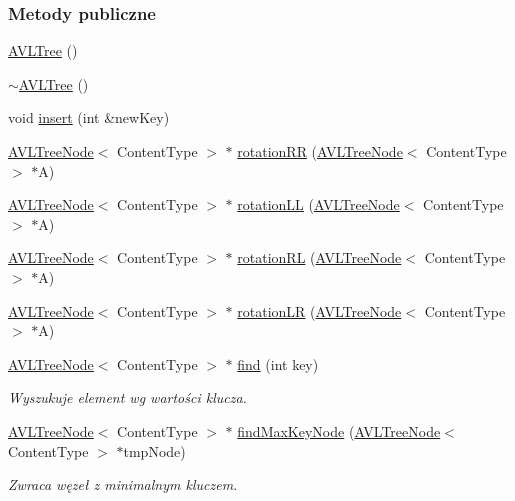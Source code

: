 \subsubsection*{Metody publiczne}
\begin{DoxyCompactItemize}
\item 
\hyperlink{class_a_v_l_tree_ab2eeaf55f5521c4d9d0090b0ea74c92c}{A\-V\-L\-Tree} ()
\item 
\hyperlink{class_a_v_l_tree_a51346b432823dce79badfd69e0a4236c}{$\sim$\-A\-V\-L\-Tree} ()
\item 
void \hyperlink{class_a_v_l_tree_a3a85ff5f0b56af6c8b358611f8de95af}{insert} (int \&new\-Key)
\item 
\hyperlink{class_a_v_l_tree_node}{A\-V\-L\-Tree\-Node}$<$ Content\-Type $>$ $\ast$ \hyperlink{class_a_v_l_tree_a81a6d1f73184e06ad92861b6ec2f96d7}{rotation\-R\-R} (\hyperlink{class_a_v_l_tree_node}{A\-V\-L\-Tree\-Node}$<$ Content\-Type $>$ $\ast$A)
\item 
\hyperlink{class_a_v_l_tree_node}{A\-V\-L\-Tree\-Node}$<$ Content\-Type $>$ $\ast$ \hyperlink{class_a_v_l_tree_a1e0560fa0ca27be07971223df9639b03}{rotation\-L\-L} (\hyperlink{class_a_v_l_tree_node}{A\-V\-L\-Tree\-Node}$<$ Content\-Type $>$ $\ast$A)
\item 
\hyperlink{class_a_v_l_tree_node}{A\-V\-L\-Tree\-Node}$<$ Content\-Type $>$ $\ast$ \hyperlink{class_a_v_l_tree_aae2d0b03656204df27bebda84229b226}{rotation\-R\-L} (\hyperlink{class_a_v_l_tree_node}{A\-V\-L\-Tree\-Node}$<$ Content\-Type $>$ $\ast$A)
\item 
\hyperlink{class_a_v_l_tree_node}{A\-V\-L\-Tree\-Node}$<$ Content\-Type $>$ $\ast$ \hyperlink{class_a_v_l_tree_a5751bfd512b5dfe32060a649f697d5f0}{rotation\-L\-R} (\hyperlink{class_a_v_l_tree_node}{A\-V\-L\-Tree\-Node}$<$ Content\-Type $>$ $\ast$A)
\item 
\hyperlink{class_a_v_l_tree_node}{A\-V\-L\-Tree\-Node}$<$ Content\-Type $>$ $\ast$ \hyperlink{class_a_v_l_tree_aee790e9dba096b0b8077602bccb0f2ca}{find} (int key)
\begin{DoxyCompactList}\small\item\em Wyszukuje element wg wartości klucza. \end{DoxyCompactList}\item 
\hyperlink{class_a_v_l_tree_node}{A\-V\-L\-Tree\-Node}$<$ Content\-Type $>$ $\ast$ \hyperlink{class_a_v_l_tree_a2e7405f8939b072489bb4ffd4521b374}{find\-Max\-Key\-Node} (\hyperlink{class_a_v_l_tree_node}{A\-V\-L\-Tree\-Node}$<$ Content\-Type $>$ $\ast$tmp\-Node)
\begin{DoxyCompactList}\small\item\em Zwraca węzeł z minimalnym kluczem. \end{DoxyCompactList}\item 

\end{DoxyCompactItemize}
